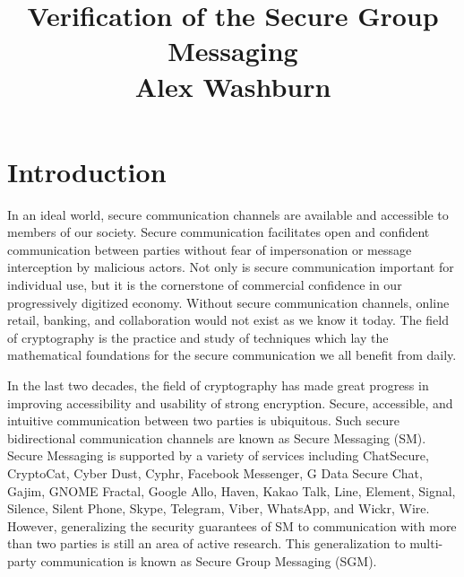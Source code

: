 \documentclass[12pt,twocolumn]{article}
\begin{document}
	
	\author{}
	\date{}
	\title{\vspace{-8ex} \textbf{Verification of the Secure Group Messaging}\\ \Large Alex Washburn\vspace{-7ex}}
	\thispagestyle{plain}

	
	\section*{Introduction}
	
	In an ideal world, secure communication channels are available and accessible to members of our society.
	Secure communication facilitates open and confident communication between parties without fear of impersonation or message interception by malicious actors.
	Not only is secure communication important for individual use, but it is the cornerstone of commercial confidence in our progressively digitized economy.
	Without secure communication channels, online retail, banking, and collaboration would not exist as we know it today.
	The field of cryptography is the practice and study of techniques which lay the mathematical foundations for the secure communication we all benefit from daily.
	
	In the last two decades, the field of cryptography has made great progress in improving accessibility and usability of strong encryption.
	Secure, accessible, and intuitive communication between two parties is ubiquitous.
	Such secure bidirectional communication channels are known as Secure Messaging (SM).
	Secure Messaging is supported by a variety of services including ChatSecure, CryptoCat, Cyber Dust, Cyphr, Facebook Messenger, G Data Secure Chat, Gajim, GNOME Fractal, Google Allo, Haven, Kakao Talk, Line, Element, Signal, Silence, Silent Phone, Skype, Telegram, Viber, WhatsApp, and Wickr, Wire.
	However, generalizing the security guarantees of SM to communication with more than two parties is still an area of active research.
	This generalization to multi-party communication is known as Secure Group Messaging (SGM).
	
\end{document}
